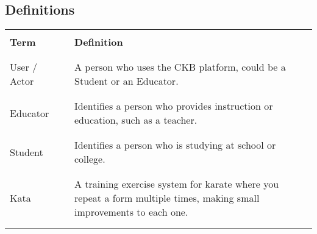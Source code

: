 \subsection{Definitions}
\begin{table}[H]
    \centering
    \renewcommand{\arraystretch}{0.5}
    \begin{tabular}{l l p{10cm}}
        \hline
                            &        &                                                                                                                        \\
        \textbf{Term}       & \vline & \textbf{Definition}                                                                                                    \\
                            &        &                                                                                                                        \\\hline \\
        User / Actor        & \vline & A person who uses the CKB platform, could be a Student or an Educator.                                                 \\       
                            &        &                                                                                                                        \\\hline \\
        Educator            & \vline & Identifies a person who provides instruction or education, such as a teacher.                                          \\
                            &        &                                                                                                                        \\\hline \\
        Student             & \vline & Identifies a person who is studying at school or college.                                                              \\
                            &        &                                                                                                                        \\\hline \\
        Kata                & \vline & A training exercise system for karate where you repeat a form multiple times, making small improvements to each one.   \\
                            &        &                                                                                                                        \\\hline \\

\end{tabular}
\end{table}
